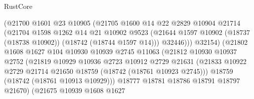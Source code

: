 \begin{lexlean}{RustCore}
\begin{coremodule}
                              (@21700
                                @1601
                                @23
                                @10905
                                (@21705
                                  @1600
                                  @14
                                  @22
                                  @2829
                                  @10904
                                  @21714
                                  (@21704
                                    @1598
                                    @1262
                                    @14
                                    @21
                                    @10902
                                    @9523
                                    (@21644
                                      @1597
                                      @10902
                                      (@18737 (@18738 @10902))
                                      (@18742 (@18744 @1597 @14)))
                                    @32446)))
                              @32154)
                            (@21802
                              @1608
                              @1627
                              @104
                              @10930
                              @10939
                              @2745
                              @11063
                              (@21812
                                @10930
                                @10937
                                @2752
                                (@21819
                                  @10929
                                  @10936
                                  @2723
                                  @10912
                                  @2729
                                  @21631
                                  (@21833
                                    @10922
                                    @2729
                                    @21714
                                    @21650
                                    @18759
                                    (@18742 (@18761 @10923 @2745)))
                                  @18759
                                  (@18742 (@18761 @10913 @10929)))
                                @18777
                                @18781
                                @18786
                                @18791
                                @18797
                                @21670)
                              (@21675
                                @10939
                                @1608
                                @1627

\end{coremodule}
\end{lexlean}
